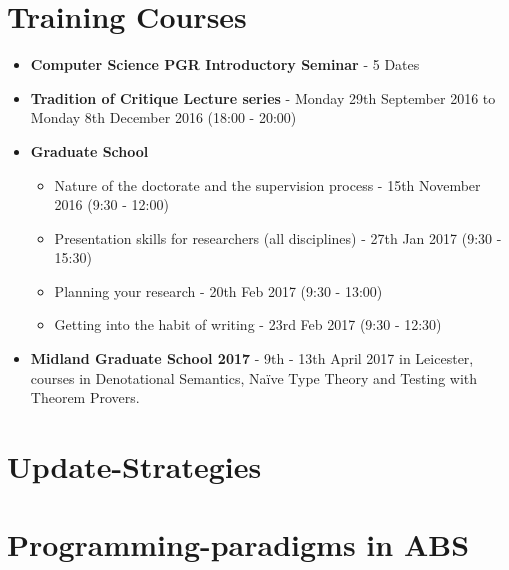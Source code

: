 \begin{appendices}
\chapter{Training Courses}
\label{app:courses}
\begin{itemize}
\item \textbf{Computer Science PGR Introductory Seminar} - 5 Dates
\item \textbf{Tradition of Critique Lecture series} - Monday 29th September 2016 to Monday 8th December 2016 (18:00 - 20:00)
\item \textbf{Graduate School}
	\begin{itemize}	
		\item Nature of the doctorate and the supervision process - 15th November 2016 (9:30 - 12:00)
		\item Presentation skills for researchers (all disciplines) - 27th Jan 2017 (9:30 - 15:30)
		\item Planning your research - 20th Feb 2017 (9:30 - 13:00)
		\item Getting into the habit of writing - 23rd Feb 2017 (9:30 - 12:30)
	\end{itemize}
\item \textbf{Midland Graduate School 2017} - 9th - 13th April 2017 in Leicester, courses in Denotational Semantics, Naïve Type Theory and Testing with Theorem Provers.
\end{itemize}



\chapter{Update-Strategies}
\label{app:updateStrategies}


\chapter{Programming-paradigms in ABS}
\label{app:paradigms}




\end{appendices}